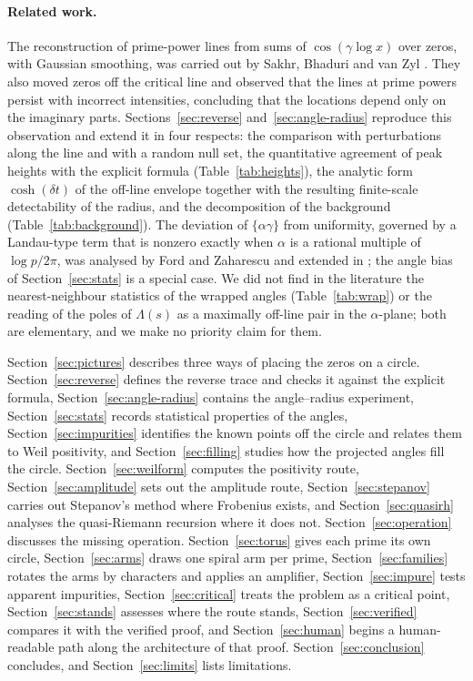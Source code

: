 \documentclass[11pt,a4paper]{article}
\theoremstyle{definition}\newtheorem{definition}[proposition]{Definition}
\theoremstyle{remark}\newtheorem{remark}[proposition]{Remark}
\begin{document}
\paragraph{Related work.} The reconstruction of prime-power lines from sums of $\cos(\gamma\log x)$ over zeros, with Gaussian smoothing, was carried out by Sakhr, Bhaduri and van Zyl \cite{SakhrBhaduriVanZyl2003}. They also moved zeros off the critical line and observed that the lines at prime powers persist with incorrect intensities, concluding that the locations depend only on the imaginary parts. Sections~\ref{sec:reverse} and~\ref{sec:angle-radius} reproduce this observation and extend it in four respects: the comparison with perturbations along the line and with a random null set, the quantitative agreement of peak heights with the explicit formula (Table~\ref{tab:heights}), the analytic form $\cosh(\delta t)$ of the off-line envelope together with the resulting finite-scale detectability of the radius, and the decomposition of the background (Table~\ref{tab:background}). The deviation of $\{\alpha\gamma\}$ from uniformity, governed by a Landau-type term that is nonzero exactly when $\alpha$ is a rational multiple of $\log p/2\pi$, was analysed by Ford and Zaharescu \cite{FordZaharescu2005} and extended in \cite{FordSoundararajanZaharescu,FordMengZaharescu}; the angle bias of Section~\ref{sec:stats} is a special case. We did not find in the literature the nearest-neighbour statistics of the wrapped angles (Table~\ref{tab:wrap}) or the reading of the poles of $\Lambda(s)$ as a maximally off-line pair in the $\alpha$-plane; both are elementary, and we make no priority claim for them.

Section~\ref{sec:pictures} describes three ways of placing the zeros on a circle. Section~\ref{sec:reverse} defines the reverse trace and checks it against the explicit formula, Section~\ref{sec:angle-radius} contains the angle--radius experiment, Section~\ref{sec:stats} records statistical properties of the angles, Section~\ref{sec:impurities} identifies the known points off the circle and relates them to Weil positivity, and Section~\ref{sec:filling} studies how the projected angles fill the circle. Section~\ref{sec:weilform} computes the positivity route, Section~\ref{sec:amplitude} sets out the amplitude route, Section~\ref{sec:stepanov} carries out Stepanov's method where Frobenius exists, and Section~\ref{sec:quasirh} analyses the quasi-Riemann recursion where it does not. Section~\ref{sec:operation} discusses the missing operation. Section~\ref{sec:torus} gives each prime its own circle, Section~\ref{sec:arms} draws one spiral arm per prime, Section~\ref{sec:families} rotates the arms by characters and applies an amplifier, Section~\ref{sec:impure} tests apparent impurities, Section~\ref{sec:critical} treats the problem as a critical point, Section~\ref{sec:stands} assesses where the route stands, Section~\ref{sec:verified} compares it with the verified proof, and Section~\ref{sec:human} begins a human-readable path along the architecture of that proof. Section~\ref{sec:conclusion} concludes, and Section~\ref{sec:limits} lists limitations.
\end{document}
